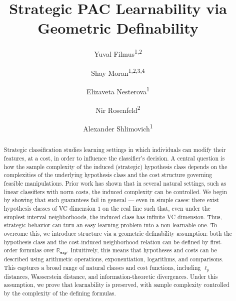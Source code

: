 \documentclass[11pt]{article}
\title{Strategic PAC Learnability via Geometric Definability}
\author{
Yuval Filmus\textsuperscript{1,2}
\and
Shay Moran\textsuperscript{1,2,3,4}
\and
Elizaveta Nesterova\textsuperscript{1}
\and
Nir Rosenfeld\textsuperscript{2}
\and
Alexander Shlimovich\textsuperscript{1}
\\[1ex]
}
\date{}
\theoremstyle{plain}
\theoremstyle{definition}
\theoremstyle{remark}
\begin{document}
\maketitle



\begingroup
\renewcommand\thefootnote{}
\endgroup


\begin{abstract}
Strategic classification studies learning settings in which individuals can modify their features, at a cost, in order to influence the classifier’s decision. A central question is how the sample complexity of the induced (strategic) hypothesis class depends on the complexities of the underlying hypothesis class and the cost structure governing feasible manipulations. 
Prior work has shown that in several natural settings, such as linear classifiers with norm costs, the induced complexity can be controlled.
We begin by showing that such guarantees fail in general --- even in simple cases: there exist hypothesis classes of VC dimension $1$ on the real line such that, even under the simplest interval neighborhoods, the induced class has infinite VC dimension. Thus, strategic behavior can turn an easy learning problem into a non-learnable one.
To overcome this, we introduce structure via a geometric definability assumption: both the hypothesis class and the cost-induced neighborhood relation can be defined by first-order formulas over $\mathbb R_{\mathtt{exp}}$. Intuitively, this means that hypotheses and costs can be described using arithmetic operations, exponentiation, logarithms, and comparisons. This captures a broad range of natural classes and cost functions, including $\ell_p$ distances, Wasserstein distance, and information-theoretic divergences.
Under this assumption, we prove that learnability is preserved, with sample complexity controlled by the complexity of the defining formulas.
\end{abstract}
\end{document}
